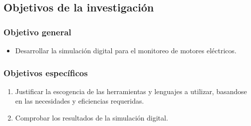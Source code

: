\subsection{Objetivos de la investigación}

\subsubsection{Objetivo general}
\begin{itemize}
	\item  Desarrollar la simulación digital para el monitoreo de motores eléctricos.
\end{itemize}
\subsubsection{Objetivos específicos}

	\begin{enumerate}
		\item Justificar la escogencia de las herramientas y lenguajes a utilizar, basandose en las necesidades y eficiencias requeridas.

		\item Comprobar los resultados de la simulación digital.
	\end{enumerate}